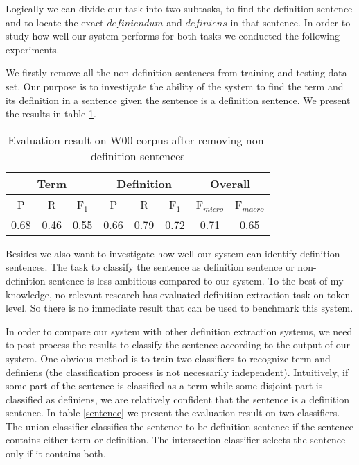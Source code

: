 \documentclass[hyp]{socreport}
\begin{document}
Logically we can divide our task into two subtasks, to find the definition sentence and to locate the exact $definiendum$ and $definiens$ in that sentence. In order to study how well our system performs for both tasks we conducted the following experiments.

We firstly remove all the non-definition sentences from training and testing data set. Our purpose is to investigate the ability of the system to find the term and its definition in a sentence given the sentence is a definition sentence. We present the results in table \ref{rmnd}.

\begin{table}
	
    \centering
\begin{tabular}{|c|c|c|c|c|c|c|c|} 
\hline 
\multicolumn{3}{|c|}{\bf{Term}} & \multicolumn{3}{|c|}{\bf{Definition}} & \multicolumn{2}{|c|}{\bf{Overall}} \\ 
\hline 
P &R &F$_1$ & P &R &F$_1$ & F$_{micro}$ &F$_{macro}$\\ 
\hline 
0.68 & 0.46 & 0.55 & 0.66 & 0.79 & 0.72 & 0.71 & 0.65 \\ \hline 
    \end{tabular}
    \caption{Evaluation result on W00 corpus after removing non-definition sentences}
    \label{rmnd}
\end{table}

Besides we also want to investigate how well our system can identify definition sentences. The task to classify the sentence as definition sentence or non-definition sentence is less ambitious compared to our system. To the best of my knowledge, no relevant research has evaluated definition extraction task on token level. So there is no immediate result that can be used to benchmark this system. 

In order to compare our system with other definition extraction systems, we need to post-process the results to classify the sentence according to the output of our system. One obvious method is to train two classifiers to recognize term and definiens (the classification process is not necessarily independent). Intuitively, if some part of the sentence is classified as a term while some disjoint part is classified as definiens, we are relatively confident that the sentence is a definition sentence. In table \ref{sentence} we present the evaluation result on two classifiers. The union classifier classifies the sentence to be definition sentence if the sentence contains either term or definition. The intersection classifier selects the sentence only if it contains both. 
\end{document}
